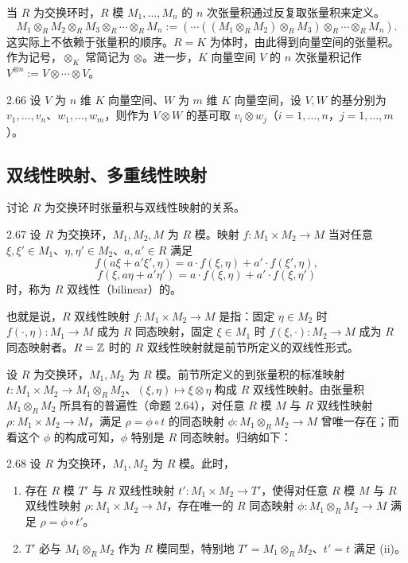 当 $R$ 为交换环时，$R$ 模 $M_1,\ldots,M_n$ 的 $n$ 次张量积通过反复取张量积来定义。
\[
  M_1\otimes_R M_2\otimes_R M_3\otimes_R\cdots\otimes_R M_n := (\cdots((M_1\otimes_R M_2)\otimes_R M_3)\otimes_R\cdots\otimes_R M_n).
\]
这实际上不依赖于张量积的顺序。$R=K$ 为体时，由此得到向量空间的张量积。作为记号，$\otimes_K$ 常简记为 $\otimes$。进一步，$K$ 向量空间 $V$ 的 $n$ 次张量积记作 $V^{\otimes n}:=V\otimes\cdots\otimes V$。

\begin{remark}{2.66} 设 $V$ 为 $n$ 维 $K$ 向量空间、$W$ 为 $m$ 维 $K$ 向量空间，设 $V,W$ 的基分别为 $v_1,\ldots,v_n$、$w_1,\ldots,w_m$，则作为 $V\otimes W$ 的基可取 $v_i\otimes w_j$（$i=1,\ldots,n$，$j=1,\ldots,m$）。\end{remark}

\subsection{双线性映射、多重线性映射}

讨论 $R$ 为交换环时张量积与双线性映射的关系。

\begin{definition}{2.67} 设 $R$ 为交换环，$M_1,M_2,M$ 为 $R$ 模。映射 $f\colon M_1\times M_2\to M$ 当对任意 $\xi,\xi'\in M_1$、$\eta,\eta'\in M_2$、$a,a'\in R$ 满足
\[
  f(a\xi+a'\xi',\eta)=a\cdot f(\xi,\eta)+a'\cdot f(\xi',\eta),
\]
\[
  f(\xi,a\eta+a'\eta')=a\cdot f(\xi,\eta)+a'\cdot f(\xi,\eta')
\]
时，称为 $R$ 双线性（bilinear）的。\end{definition}

也就是说，$R$ 双线性映射 $f\colon M_1\times M_2\to M$ 是指：固定 $\eta\in M_2$ 时 $f(\cdot,\eta)\colon M_1\to M$ 成为 $R$ 同态映射，固定 $\xi\in M_1$ 时 $f(\xi,\cdot)\colon M_2\to M$ 成为 $R$ 同态映射者。$R=\mathbb{Z}$ 时的 $R$ 双线性映射就是前节所定义的双线性形式。

设 $R$ 为交换环，$M_1,M_2$ 为 $R$ 模。前节所定义的到张量积的标准映射 $t\colon M_1\times M_2\to M_1\otimes_R M_2$、$(\xi,\eta)\mapsto\xi\otimes\eta$ 构成 $R$ 双线性映射。由张量积 $M_1\otimes_R M_2$ 所具有的普遍性（命题 2.64），对任意 $R$ 模 $M$
与 $R$ 双线性映射 $\rho\colon M_1\times M_2\to M$，满足 $\rho=\phi\circ t$ 的同态映射 $\phi\colon M_1\otimes_R M_2\to M$ 曾唯一存在；而看这个 $\phi$ 的构成可知，$\phi$ 特别是 $R$ 同态映射。归纳如下：

\begin{proposition}{2.68} 设 $R$ 为交换环，$M_1,M_2$ 为 $R$ 模。此时，
\begin{enumerate}[label=(\roman*), leftmargin=*]
  \item 存在 $R$ 模 $T'$ 与 $R$ 双线性映射 $t'\colon M_1\times M_2\to T'$，使得对任意 $R$ 模 $M$ 与 $R$ 双线性映射 $\rho\colon M_1\times M_2\to M$，存在唯一的 $R$ 同态映射 $\phi\colon M_1\otimes_R M_2\to M$ 满足 $\rho=\phi\circ t'$。
  \item $T'$ 必与 $M_1\otimes_R M_2$ 作为 $R$ 模同型，特别地 $T'=M_1\otimes_R M_2$、$t'=t$ 满足 (ii)。
\end{enumerate}
\end{proposition}

